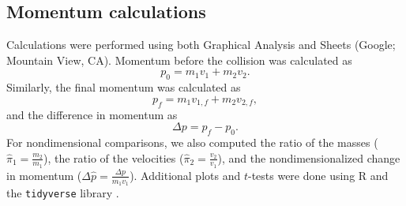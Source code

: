\documentclass[aps,prl,preprint]{revtex4-1}
\begin{document}
 \subsection{Momentum calculations}
 Calculations were performed using both Graphical Analysis and Sheets (Google; Mountain View, CA). 
 Momentum before the collision was calculated as
 \begin{equation}
 p_0 = m_1 v_1 + m_2 v_2.
 \end{equation}
Similarly, the final momentum was calculated as
 \begin{equation}
 p_f = m_1 v_{1,f} + m_2 v_{2,f}, 
 \end{equation}
and the difference in momentum as 
 \begin{equation}
\Delta p =  p_f - p_0. 
 \end{equation}
For nondimensional comparisons, we also computed the ratio of the masses ($\hat{\pi}_1=\frac{m_2}{m_1}$), the ratio of the velocities ($\hat{\pi}_2=\frac{v_2}{v_1}$), and the nondimensionalized change in momentum ($\Delta\hat{p}=\frac{\Delta p}{m_1 v_1}$). Additional plots and $t$-tests were done using R \cite{r-2021} and the \lstinline{tidyverse} library \cite{wickham-2019-welcome}. 
\end{document}
